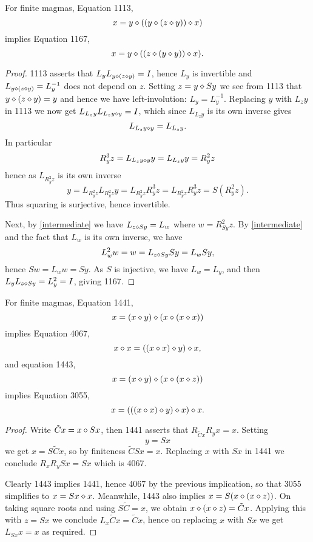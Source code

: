 \begin{proposition}[1113 implies 1167]\label{1113-1167}
  For finite magmas, Equation 1113,
$$ x = y \diamond ((y \diamond (z \diamond y)) \diamond x)$$
implies Equation 1167,
  $$ x = y \diamond ((z \diamond (y \diamond y)) \diamond x).$$
\end{proposition}

\begin{proof}
1113 asserts that $L_y L_{y \diamond (z \diamond y)} = I$, hence $L_y$ is invertible and $L_{y \diamond (z \diamond y)} = L_y^{-1}$ does not depend on $z$.  Setting $z = y \diamond Sy$ we see from 1113 that $y \diamond (z \diamond y) = y$ and hence we have left-involution: $L_y = L_y^{-1}$. Replacing $y$ with $L_z y$ in 1113 we now get $L_{L_z y} L_{L_z y \diamond y} = I$, which since $L_{L_z y}$ is its own inverse gives
\begin{equation}\label{intermediate}
  L_{L_z y \diamond y} = L_{L_z y}.
\end{equation}
In particular
$$ R_y^3 z = L_{L_z y \diamond y} y = L_{L_z y} y = R_y^2 z$$
hence as $L_{R_y^2 z}$ is its own inverse
$$ y =L_{R_y^2 z} L_{R_y^2 z} y = L_{R_y^2 z} R_y^3 z =
L_{R_y^2 z} R_y^3 z = S( R_y^2 z).$$
Thus squaring is surjective, hence invertible.

Next, by \eqref{intermediate} we have $L_{z \diamond Sy} = L_w$ where $w = R_{Sy}^2 z$.  By \eqref{intermediate} and the fact that $L_w$ is its own inverse, we have
$$ L_w^2 w = w = L_{z \diamond Sy} Sy =L_w Sy,$$
hence $Sw = L_w w = Sy$.  As $S$ is injective, we have $L_w = L_y$, and then $L_y L_{z \diamond Sy} = L_y^2 = I$, giving 1167.
\end{proof}

\begin{proposition}\label{1441-4067-1443-3055}
  For finite magmas, Equation 1441,
$$ x = (x \diamond y) \diamond (x \diamond (x \diamond x))$$
implies Equation 4067,
$$ x \diamond x = ((x \diamond x) \diamond y) \diamond x,$$
and equation 1443,
$$ x = (x \diamond y) \diamond (x \diamond (x \diamond z))$$
implies Equation 3055,
$$ x = (((x \diamond x) \diamond y) \diamond x) \diamond x.$$
\end{proposition}

\begin{proof}
  Write $\tilde C x = x \diamond Sx$, then 1441 asserts that $R_{\tilde Cx} R_y x = x$.  Setting $$y=Sx$$ we get $x = S\tilde Cx$, so by finiteness $\tilde C Sx = x$.  Replacing $x$ with $Sx$ in 1441 we conclude $R_x R_y Sx = Sx$ which is 4067.

  Clearly 1443 implies 1441, hence 4067 by the previous implication, so that 3055 simplifies to $x = Sx \diamond x$.  Meanwhile, 1443 also implies $x = S(x \diamond (x \diamond z))$.  On taking square roots and using $S \tilde C = x$, we obtain $x \diamond (x \diamond z) = \tilde Cx$.  Applying this with $z = Sx$ we conclude $L_x \tilde Cx = \tilde Cx$, hence on replacing $x$ with $Sx$ we get $L_{Sx} x = x$ as required.
\end{proof}

